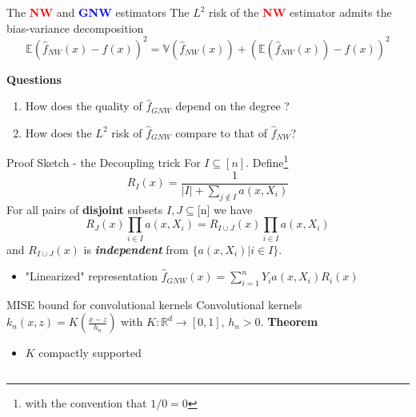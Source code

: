 \documentclass[final,dvipsnames]{beamer}
\newcommand{\myemphh}[1]{\textbf{\textcolor{blue}{#1}}}
\newcommand{\myemphr}[1]{\textbf{\textcolor{red}{#1}}}
\newcommand{\mycolbackblue}[1]{
\hspace*{.01\linewidth}\begin{minipage}{.96\linewidth}
\begin{mdframed}[backgroundcolor=blue!10,linewidth=3pt]
\vspace{10pt}
#1
\vspace{10pt}
\end{mdframed}
\end{minipage}
}
\newcommand{\mycolbackgreenw}[1]{
\hspace*{.01\linewidth}\begin{minipage}{.96\linewidth}
\begin{mdframed}[backgroundcolor=blue!10,linewidth=1pt]
\vspace{10pt}
#1
\vspace{10pt}
\end{mdframed}
\end{minipage}
}
\begin{document}
\begin{frame}
\begin{columns}[T]
\begin{column}{0.48\textwidth}
\begin{block}{The \myemphr{NW} and \myemphh{GNW} estimators}
\small The $L^2$ risk of the \myemphr{NW} estimator admits the bias-variance decomposition 
\vspace{10pt}
\begin{equation*}
    \mathbb{E}(\hat{f}_{NW}(x)-f(x))^2=\mathbb{V}(\hat{f}_{NW}(x))+(\mathbb{E}(\hat{f}_{NW}(x))-f(x))^2
\end{equation*}
\mycolbackgreenw{\textbf{Questions}
\vspace{10pt}
\begin{center}
    \begin{enumerate}
        \item How does the quality of $\hat{f}_{GNW}$ depend on the degree ?
        \vspace{10pt}
        \item How does the $L^2$ risk of $\hat{f}_{GNW}$ compare to that of $\hat{f}_{NW}$?
    \end{enumerate}
\end{center}
}
\end{block}
\begin{block}{Proof Sketch - the Decoupling trick}
    For $I\subseteq [n]$. Define\footnote{with the convention that $1/0=0$}  
    \begin{equation*}
        R_I(x)=
        \frac{1}{|I|+\sum_{j\notin I}a(x,X_i)}
    \end{equation*}
    For all pairs of \textbf{disjoint} subsets $I,J\subseteq$[n] we have
    \begin{equation*}
    R_J(x)\prod_{i\in I}a(x,X_i)=R_{I\cup J}(x)\prod_{i\in I}a(x,X_i)
    \end{equation*}
    \small and $R_{I\cup J}(x)$ is \textbf{\textit{independent}} from $\{a(x,X_i)|i\in I\}$.
    \vspace{20pt}
    \begin{itemize}
        \small \item "Linearized" representation 
     $\hat{f}_{GNW}(x)=\sum_{i=1}^nY_ia(x,X_i)R_i(x)$  
    \end{itemize}
\end{block}
\begin{block}{MISE bound for convolutional kernels}
    Convolutional kernels $k_n(x,z)=K(\frac{x-z}{h_n})$ with $K\colon\mathbb{R}^d\to [0,1]$, $h_n>0$.
    \vspace{10pt}
    \textbf{Theorem}
    \vspace{10pt}
    \begin{itemize}
        \small \item $K$ compactly supported 

\end{itemize}
\end{block}
\end{column}
\end{columns}
\end{frame}
\end{document}
